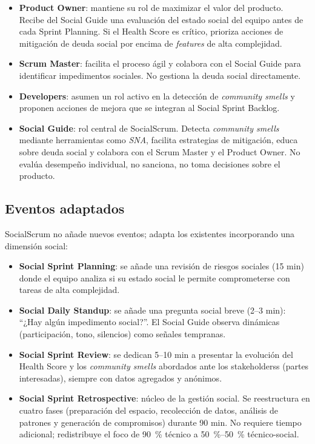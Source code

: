 \begin{itemize}
    \item \textbf{Product Owner}: mantiene su rol de maximizar el valor del producto. Recibe del Social Guide una evaluación del estado social del equipo antes de cada Sprint Planning. Si el Health Score es crítico, prioriza acciones de mitigación de deuda social por encima de \textit{features} de alta complejidad.
    \item \textbf{Scrum Master}: facilita el proceso ágil y colabora con el Social Guide para identificar impedimentos sociales. No gestiona la deuda social directamente.
    \item \textbf{Developers}: asumen un rol activo en la detección de \textit{community smells} y proponen acciones de mejora que se integran al Social Sprint Backlog.
    \item \textbf{Social Guide}: rol central de SocialScrum. Detecta \textit{community smells} mediante herramientas como \textit{SNA}, facilita estrategias de mitigación, educa sobre deuda social y colabora con el Scrum Master y el Product Owner. No evalúa desempeño individual, no sanciona, no toma decisiones sobre el producto.
\end{itemize}

\subsection{Eventos adaptados}

SocialScrum no añade nuevos eventos; adapta los existentes incorporando una dimensión social:

\begin{itemize}
    \item \textbf{Social Sprint Planning}: se añade una revisión de riesgos sociales (15 min) donde el equipo analiza si su estado social le permite comprometerse con tareas de alta complejidad.
    \item \textbf{Social Daily Standup}: se añade una pregunta social breve (2--3 min): ``¿Hay algún impedimento social?''. El Social Guide observa dinámicas (participación, tono, silencios) como señales tempranas.
    \item \textbf{Social Sprint Review}: se dedican 5--10 min a presentar la evolución del Health Score y los \textit{community smells} abordados ante los \glspl{stakeholders} (partes interesadas), siempre con datos agregados y anónimos.
    \item \textbf{Social Sprint Retrospective}: núcleo de la gestión social. Se reestructura en cuatro fases (preparación del espacio, recolección de datos, análisis de patrones y generación de compromisos) durante 90 min. No requiere tiempo adicional; redistribuye el foco de 90~\% técnico a 50~\%--50~\% técnico-social.
\end{itemize}

